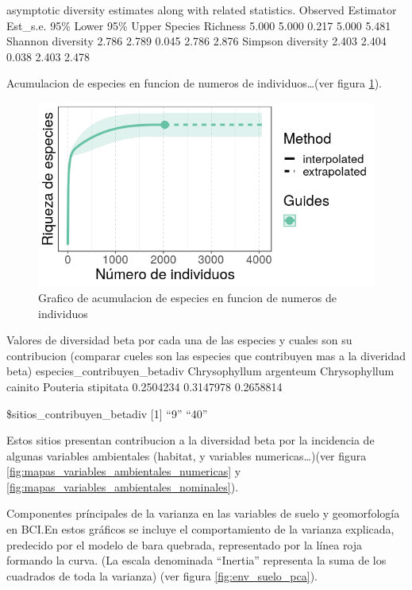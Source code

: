\documentclass[11pt,]{article}
\begin{document}
asymptotic diversity estimates along with related statistics. Observed
Estimator Est\_s.e. 95\% Lower 95\% Upper Species Richness 5.000 5.000
0.217 5.000 5.481 Shannon diversity 2.786 2.789 0.045 2.786 2.876
Simpson diversity 2.403 2.404 0.038 2.403 2.478

Acumulacion de especies en funcion de numeros de individuos\ldots{}(ver
figura \ref{fig:acumulacion_especies_individuos}).

\begin{figure}
\centering
\includegraphics{acumulacion_especies_individuos.png}
\caption{Grafico de acumulacion de especies en funcion de numeros de
individuos \label{fig:acumulacion_especies_individuos}}
\end{figure}

Valores de diversidad beta por cada una de las especies y cuales son su
contribucion (comparar cueles son las especies que contribuyen mas a la
diveridad beta) especies\_contribuyen\_betadiv Chrysophyllum argenteum
Chrysophyllum cainito Pouteria stipitata 0.2504234 0.3147978 0.2658814

\$sitios\_contribuyen\_betadiv {[}1{]} ``9'' ``40''

Estos sitios presentan contribucion a la diversidad beta por la
incidencia de algunas variables ambientales (habitat, y variables
numericas\ldots{})(ver figura
\ref{fig:mapas_variables_ambientales_numericas} y
\ref{fig:mapas_variables_ambientales_nominales}).

Componentes príncipales de la varianza en las variables de suelo y
geomorfología en BCI.En estos gráficos se incluye el comportamiento de
la varianza explicada, predecido por el modelo de bara quebrada,
representado por la línea roja formando la curva. (La escala denominada
``Inertia'' representa la suma de los cuadrados de toda la varianza)
(ver figura \ref{fig:env_suelo_pca}).
\end{document}
